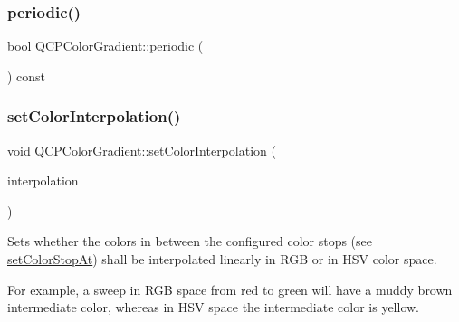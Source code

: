 \mbox{\label{class_q_c_p_color_gradient_a22a1d2b17f203caf0dcec833507fb9e0}} 
\subsubsection{\texorpdfstring{periodic()}{periodic()}}
{\footnotesize\ttfamily bool Q\+C\+P\+Color\+Gradient\+::periodic (\begin{DoxyParamCaption}{ }\end{DoxyParamCaption}) const\hspace{0.3cm}{\ttfamily [inline]}}

\mbox{\label{class_q_c_p_color_gradient_aa13fda86406e1d896a465a409ae63b38}} 
\subsubsection{\texorpdfstring{set\+Color\+Interpolation()}{setColorInterpolation()}}
{\footnotesize\ttfamily void Q\+C\+P\+Color\+Gradient\+::set\+Color\+Interpolation (\begin{DoxyParamCaption}\item[{\hyperlink{class_q_c_p_color_gradient_ac5dca17cc24336e6ca176610e7f77fc1}{Q\+C\+P\+Color\+Gradient\+::\+Color\+Interpolation}}]{interpolation }\end{DoxyParamCaption})}

Sets whether the colors in between the configured color stops (see \hyperlink{class_q_c_p_color_gradient_a3b48be5e78079db1bb2a1188a4c3390e}{set\+Color\+Stop\+At}) shall be interpolated linearly in R\+GB or in H\+SV color space.

For example, a sweep in R\+GB space from red to green will have a muddy brown intermediate color, whereas in H\+SV space the intermediate color is yellow. \mbox{\label{class_q_c_p_color_gradient_a3b48be5e78079db1bb2a1188a4c3390e}} 
